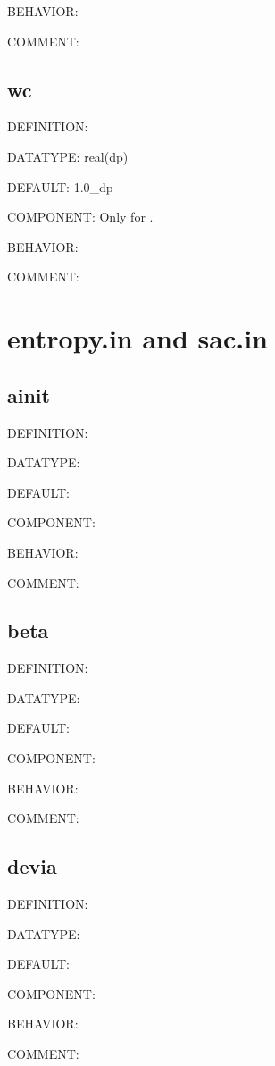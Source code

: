 {\color{purple}BEHAVIOR:}

{\color{olive}COMMENT:}

\subsection{wc}
{\color{red}DEFINITION:}

{\color{green}DATATYPE:} real(dp)

{\color{blue}DEFAULT:} 1.0\_dp

{\color{brown}COMPONENT:} Only for {\narcissus}.

{\color{purple}BEHAVIOR:}

{\color{olive}COMMENT:}

\section{entropy.in and sac.in}
\subsection{ainit}
{\color{red}DEFINITION:}

{\color{green}DATATYPE:}

{\color{blue}DEFAULT:}

{\color{brown}COMPONENT:}

{\color{purple}BEHAVIOR:}

{\color{olive}COMMENT:}

\subsection{beta}
{\color{red}DEFINITION:}

{\color{green}DATATYPE:}

{\color{blue}DEFAULT:}

{\color{brown}COMPONENT:}

{\color{purple}BEHAVIOR:}

{\color{olive}COMMENT:}

\subsection{devia}
{\color{red}DEFINITION:}

{\color{green}DATATYPE:}

{\color{blue}DEFAULT:}

{\color{brown}COMPONENT:}

{\color{purple}BEHAVIOR:}

{\color{olive}COMMENT:}

